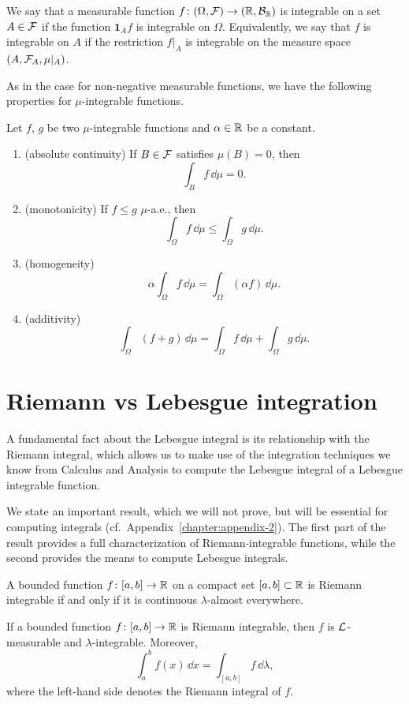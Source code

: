 We say that a measurable function $f\colon(\Omega, \mathcal F) \to (\mathbb R, \mathcal B_{\mathbb R})$ is integrable on a set $A \in \mathcal F$ if the function $\mathbf{1}_A f$ is integrable on $\Omega$. Equivalently, we say that $f$ is integrable on $A$ if the restriction $f|_A$ is integrable on the measure space $(A, \mathcal F_A, \mu|_A)$. 


As in the case for non-negative measurable functions, we have the following properties for $\mu$-integrable functions.

\begin{proposition}\label{prop:properties-integral}
	Let $f$, $g$ be two $\mu$-integrable functions and $\alpha \in \mathbb R$ be a constant.
	\begin{enumerate}
		\item (absolute continuity) If $B \in \mathcal F$ satisfies $\mu(B) = 0$, then
		\[
		\int_{B} f\, \dd \mu = 0. 
		\]
		\item (monotonicity) If $f \leq g$ $\mu$-a.e., then
		\[
		\int_\Omega f \,\dd \mu \leq \int_\Omega g \,\dd \mu.
		\]
		\item (homogeneity) 
		\[
		\alpha \int_\Omega f \,\dd \mu = \int_\Omega (\alpha f )\,\dd \mu.
		\]
		\item (additivity)
		\[
		\int_\Omega (f + g)\, \dd \mu = \int_\Omega f 
		\,\dd \mu + \int_\Omega g \,\dd \mu.
		\]	
	\end{enumerate}
\end{proposition}



\section{Riemann vs Lebesgue integration}

A fundamental fact about the Lebesgue integral is its relationship with the Riemann integral, which allows us to make use of the integration techniques we know from Calculus and Analysis to compute the Lebesgue integral of a Lebesgue integrable function.

We state an important result, which we will not prove, but will be essential for computing integrals (cf.\ Appendix~\ref{chapter:appendix-2}). The first part of the result provides a full characterization of Riemann-integrable functions, while the second provides the means to compute Lebesgue integrals.

\begin{theorem}\label{thm:riem-leb}
	A bounded function $f\colon [a,b] \to \mathbb R$ on a compact set $[a,b]\subset\mathbb R$ is Riemann integrable if and only if it is continuous $\lambda$-almost everywhere.
	
	If a bounded function $f\colon [a,b] \to \mathbb R$ is Riemann integrable, then $f$ is $\mathcal L$-measurable and $\lambda$-integrable. Moreover,
	\[
		\int_a^b f(x) \,\dd x = \int_{[a,b]} f \,\dd \lambda,
	\]
	where the left-hand side denotes the Riemann integral of $f$.
\end{theorem}

